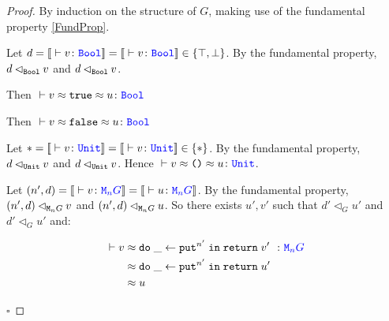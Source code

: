 \documentclass{Report}
\newcommand{\relates}[0]{\lhd}
\newcommand{\logRel}[3]{#1 \relates_{#2} #3}
\newcommand{\zberelation}[3]{\berelation{}{#1}{#2}{#3}}
\newcommand\ztyperelation[2]{\typerelation{}{#1}{#2}}
\renewcommand\put[0]{\texttt{put}}
\begin{document}
\begin{proof}
    By induction on the structure of $G$, making use of the fundamental property \ref{FundProp}.

    Let $d=\deno{\ztyperelation{v}{\B}}=\deno{\ztyperelation{v}{\B}}\in \{\top, \bot\}$. By the fundamental property, $\logRel{d}{\B}{v}$  and $\logRel{d}{\B}{v}$.

    Then $\zberelation{v\beequiv\t}{u}{\B}$

    
    Then $\zberelation{v\beequiv\f}{u}{\B}$

    Let $\singleton=\deno{\ztyperelation{v}{\U}}=\deno{\ztyperelation{v}{\U}}\in \{\singleton\}$. By the fundamental property, $\logRel{d}{\U}{v}$  and $\logRel{d}{\U}{v}$. Hence $\zberelation{v\beequiv\u}{u}{\U}$.


    Let $(n', d) = \deno{\ztyperelation{v}{\M{n}{G}}} = \deno{\ztyperelation{u}{\M{n}{G}}}$. By the fundamental property, $\logRel{(n', d)}{\M{n}{G}}{v}$ and $\logRel{(n', d)}{\M{n}{G}}{u}$. So there exists $u', v'$ such that $\logRel{d'}{G}{u'}$ and $\logRel{d'}{G}{u'}$ and:

    \begin{align}
        \zberelation{v&}{\doin{\_}{\put^{n'}}{\return{v'}}}{\M{n}{G}}\\
        &\beequiv \doin{\_}{\put^{n'}}{\return{u'}}\\
        & \beequiv u
    \end{align}
    
$\square$
\end{proof}
\end{document}
